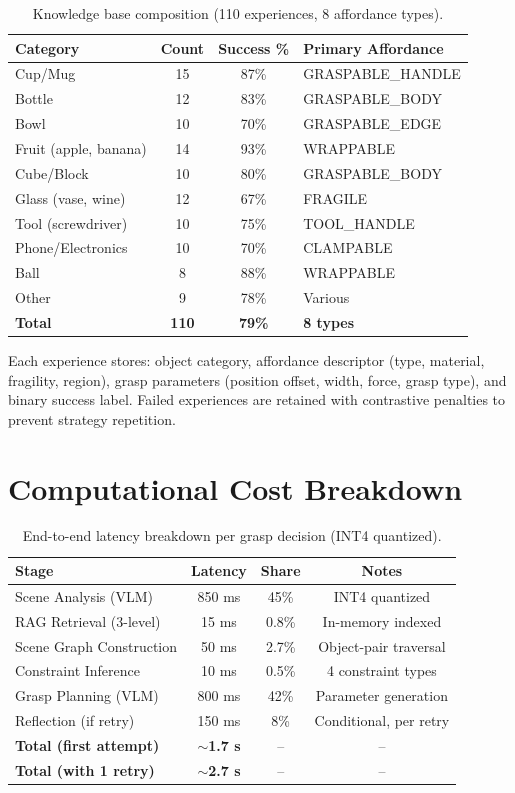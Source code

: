 \documentclass[letterpaper, 10pt]{article}
\begin{document}
\begin{table}[h]
\centering
\caption{Knowledge base composition (110 experiences, 8 affordance types).}
\begin{tabular}{@{}lccl@{}}
\toprule
\textbf{Category} & \textbf{Count} & \textbf{Success \%} & \textbf{Primary Affordance} \\
\midrule
Cup/Mug & 15 & 87\% & GRASPABLE\_HANDLE \\
Bottle & 12 & 83\% & GRASPABLE\_BODY \\
Bowl & 10 & 70\% & GRASPABLE\_EDGE \\
Fruit (apple, banana) & 14 & 93\% & WRAPPABLE \\
Cube/Block & 10 & 80\% & GRASPABLE\_BODY \\
Glass (vase, wine) & 12 & 67\% & FRAGILE \\
Tool (screwdriver) & 10 & 75\% & TOOL\_HANDLE \\
Phone/Electronics & 10 & 70\% & CLAMPABLE \\
Ball & 8 & 88\% & WRAPPABLE \\
Other & 9 & 78\% & Various \\
\midrule
\textbf{Total} & \textbf{110} & \textbf{79\%} & \textbf{8 types} \\
\bottomrule
\end{tabular}
\end{table}

Each experience stores: object category, affordance descriptor (type, material, fragility, region), grasp parameters (position offset, width, force, grasp type), and binary success label.
Failed experiences are retained with contrastive penalties to prevent strategy repetition.

\section{Computational Cost Breakdown}

\begin{table}[h]
\centering
\caption{End-to-end latency breakdown per grasp decision (INT4 quantized).}
\begin{tabular}{@{}lccc@{}}
\toprule
\textbf{Stage} & \textbf{Latency} & \textbf{Share} & \textbf{Notes} \\
\midrule
Scene Analysis (VLM) & 850 ms & 45\% & INT4 quantized \\
RAG Retrieval (3-level) & 15 ms & 0.8\% & In-memory indexed \\
Scene Graph Construction & 50 ms & 2.7\% & Object-pair traversal \\
Constraint Inference & 10 ms & 0.5\% & 4 constraint types \\
Grasp Planning (VLM) & 800 ms & 42\% & Parameter generation \\
Reflection (if retry) & 150 ms & 8\% & Conditional, per retry \\
\midrule
\textbf{Total (first attempt)} & \textbf{$\sim$1.7 s} & -- & -- \\
\textbf{Total (with 1 retry)} & \textbf{$\sim$2.7 s} & -- & -- \\
\bottomrule
\end{tabular}
\end{table}
\end{document}
